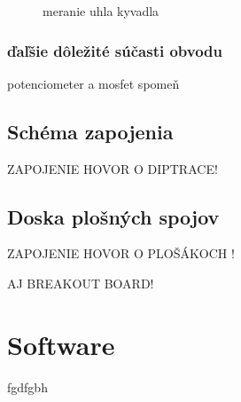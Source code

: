 \begin{figure}[!tbh]
\hfill
{}
\hfill
{}
\hfill
\caption{meranie uhla kyvadla}\label{OBRAZOK 2.2}
\end{figure}

\subsubsection{ďaľšie dôležité súčasti obvodu}
\label{ine}

potenciometer a mosfet spomeň

\subsection{Schéma zapojenia}

ZAPOJENIE HOVOR O DIPTRACE!

\subsection{Doska plošných spojov}

ZAPOJENIE HOVOR O PLOŠÁKOCH !

AJ BREAKOUT BOARD!

\section{Software}
fgdfgbh 